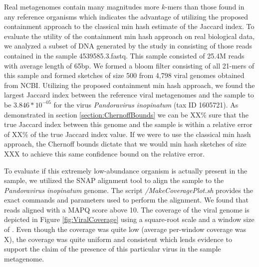\documentclass[11pt]{amsart}
\theoremstyle{remark}
\numberwithin{equation}{section}
\begin{document}
Real metagenomes contain many magnitudes more $k$-mers than those found in any reference organisms \cite{} which indicates the advantage of utilizing the proposed containment approach to the classical min hash estimate of the Jaccard index. To evaluate the utility of the containment min hash approach on real biological data, we analyzed a subset of DNA generated by the study in \cite{howe2014tackling} consisting of those reads contained in the sample 4539585.3.fastq. This sample consisted of 25.4M reads with average length of 65bp. We formed a bloom filter consisting of all 21-mers of this sample and formed sketches of size 500 from 4,798 viral genomes obtained from NCBI. Utilizing the proposed containment min hash approach, we found the largest Jaccard index between the reference viral metagenomes and the sample to be $3.846*10^{-05}$ for the virus 
\textit{Pandoravirus inopinatum} (tax ID 1605721). As demonstrated in section \ref{section:ChernoffBounds} we can be XX\% sure that the true Jaccard index between this genome and the sample is within a relative error of XX\% of the true Jaccard index value.  If we were to use the classical min hash approach, the Chernoff bounds dictate that we would min hash sketches of size XXX to achieve this same confidence bound on the relative error.

To evaluate if this extremely low-abundance organism is actually present in the sample, we utilized the SNAP alignment tool \cite{zaharia2011faster} to align the sample to the \textit{Pandoravirus inopinatum} genome. The script \textit{/MakeCoveragePlot.sh} provides the exact commands and parameters used to perform the alignment. We found that reads aligned with a MAPQ score above 10. The coverage of the viral genome is depicted in Figure \ref{fig:ViralCoverage} using a square-root scale and a window size of \protect \unskip. Even though the coverage was quite low (average per-window coverage was \unskip X), the coverage was quite uniform and consistent which lends evidence to support the claim of the presence of this particular virus in the sample metagenome.
\end{document}
